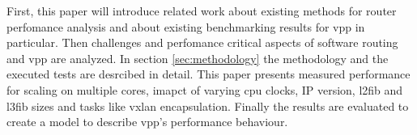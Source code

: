 
First, this paper will introduce related work about existing methods
for router perfomance analysis and about existing benchmarking results
for \Ac{vpp} in particular. Then challenges and perfomance critical
aspects of software routing and \Ac{vpp} are analyzed. In section
\ref{sec:methodology} the methodology and the executed tests are
desrcibed in detail. This paper presents measured performance for
scaling on multiple cores, imapct of varying cpu clocks, IP version,
l2fib and l3fib sizes and tasks like \Ac{vxlan} encapsulation. Finally
the results are evaluated to create a model to describe \Ac{vpp}'s
performance behaviour.
